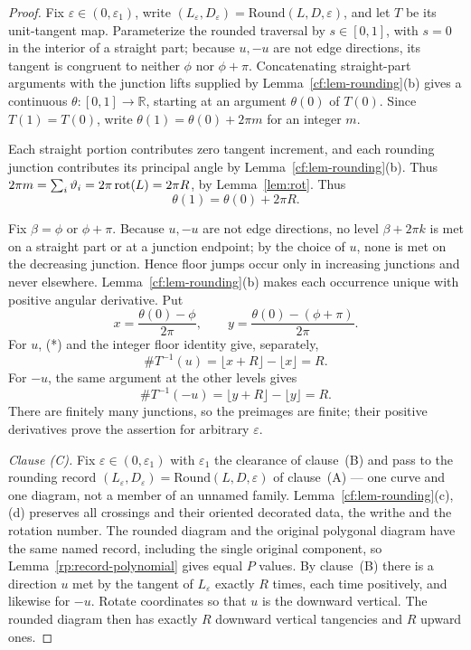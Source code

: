 \begin{proof}
Fix $\varepsilon\in(0,\varepsilon_1)$, write
$(L_\varepsilon,D_\varepsilon)=\mathrm{Round}(L,D,\varepsilon)$, and let $T$ be
its unit-tangent map. Parameterize the rounded traversal by $s\in[0,1]$, with
$s=0$ in the interior of a straight part; because $u,-u$ are not edge directions, its tangent
is congruent to neither $\phi$ nor $\phi+\pi$. Concatenating straight-part arguments
with the junction lifts supplied by Lemma~\ref{cf:lem-rounding}(b) gives a continuous
$\theta\colon[0,1]\to\mathbb R$, starting at an argument $\theta(0)$ of $T(0)$.
Since $T(1)=T(0)$, write $\theta(1)=\theta(0)+2\pi m$ for an integer $m$.

Each straight portion contributes zero tangent increment, and each
rounding junction contributes its principal angle by
Lemma~\ref{cf:lem-rounding}(b). Thus
$2\pi m=\sum_i\vartheta_i=2\pi\operatorname{rot}(L)=2\pi R$, by
Lemma~\ref{lem:rot}.
Thus
\[
 \theta(1)=\theta(0)+2\pi R.                                  \tag{*}
\]

Fix $\beta=\phi$ or $\phi+\pi$. Because $u,-u$ are not edge directions, no
level $\beta+2\pi k$ is met on a straight part or at a junction endpoint; by
the choice of $u$, none is met on the decreasing junction. Hence floor jumps
occur only in increasing junctions and never elsewhere. Lemma~\ref{cf:lem-rounding}(b)
makes each occurrence unique with positive angular derivative. Put
\[
 x=\frac{\theta(0)-\phi}{2\pi},\qquad
 y=\frac{\theta(0)-(\phi+\pi)}{2\pi}.
\]
For $u$, (*) and the integer floor identity give, separately,
\[
 \#T^{-1}(u)=\lfloor x+R\rfloor-\lfloor x\rfloor=R.
\]
For $-u$, the same argument at the other levels gives
\[
 \#T^{-1}(-u)=\lfloor y+R\rfloor-\lfloor y\rfloor=R.
\]
There are finitely many junctions, so the preimages are finite; their positive derivatives prove the assertion for arbitrary $\varepsilon$.

\emph{Clause (C).} Fix $\varepsilon\in(0,\varepsilon_1)$ with $\varepsilon_1$ the clearance of
clause~(B) and pass to the rounding record
$(L_\varepsilon,D_\varepsilon)=\mathrm{Round}(L,D,\varepsilon)$ of
clause~(A) --- one curve and one diagram, not a member
of an unnamed family. Lemma~\ref{cf:lem-rounding}(c),(d) preserves all crossings and their
oriented decorated data, the writhe and the rotation number. The rounded
diagram and the original polygonal diagram have the same named record,
including the single original component, so
Lemma~\ref{rp:record-polynomial} gives equal $P$ values. By clause~(B) there is a direction $u$ met by the tangent of
$L_\varepsilon$ exactly $R$ times, each time positively, and likewise for
$-u$. Rotate coordinates so
that $u$ is the downward vertical. The rounded diagram then has exactly $R$
downward vertical tangencies and $R$ upward ones.


\end{proof}
